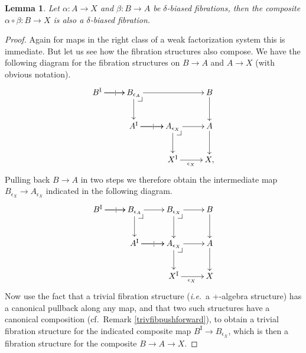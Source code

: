 \documentclass[11pt]{amsart}
\makeatletter
\newcommand{\ie}{\emph{i.e.}}
\newcommand{\ra}{\ensuremath{\rightarrow}}
\renewcommand{\to}{\ensuremath{\rightarrow}}
\newcommand{\I}{\ensuremath{\mathrm{I}}}
\newtheorem{lemma}[theorem]{Lemma}
\theoremstyle{remark}
\newtheorem{remark}[theorem]{Remark}
\theoremstyle{definition}
\newcommand{\pbcorner}[1][dr]{\save*!/#1-1.2pc/#1:(-1,1)@^{|-}\restore}
\makeatother
\begin{document}
\begin{lemma}\label{lemma:fibrationscompose}
Let  $\alpha : A \ra X$ and $\beta: B\ra A$ be $\delta$-biased fibrations, then the composite $\alpha\circ\beta : B \ra X$ is also a $\delta$-biased fibration.
\end{lemma}
\begin{proof}
Again for maps in the right class of a weak factorization system this is immediate.  But let us see how the fibration structures also compose.  We have the following diagram for the fibration structures on $B\ra A$ and $A\ra X$ (with obvious notation).
\begin{equation}\label{diagram:fibcomposition1}
\xymatrix{
B^\I \ar[r]|| \ar[r]  & B_{\epsilon_A} \ar[rr]  \ar[d] \pbcorner & & B \ar[d]\\
&A^\I \ar[r]|| \ar[r] & A_{\epsilon_X} \ar[d] \pbcorner \ar[r] & A \ar[d]\\
&& X^\I \ar[r]_{\epsilon_X} &  X,
}
\end{equation}
Pulling back $B\ra A$ in two steps we therefore obtain the intermediate map $B_{\epsilon_X} \to A_{\epsilon_X}$  indicated in the following diagram. 
\begin{equation}\label{diagram:fibcomposition2}
\xymatrix{
B^\I \ar[r]|| \ar[r]   & B_{\epsilon_A} \ar[r]  \ar[d] \pbcorner & B_{\epsilon_X}  \ar[d] \pbcorner \ar[r] & B \ar[d]\\
&A^\I \ar[r]|| \ar[r]  & A_{\epsilon_X} \ar[d] \pbcorner \ar[r] & A \ar[d]\\
&& X^\I \ar[r]_{\epsilon_X} &  X
}
\end{equation}
Now use the fact that a trivial fibration structure (\ie\ a +-algebra structure) has a canonical pullback along any map, and that two such structures have a canonical composition (cf.\ Remark \ref{trivfibpushforward}), to obtain a trivial fibration structure for the indicated composite map $B^\I \ra B_{\epsilon_X}$, which is then a fibration structure for the composite $B\to A\to X$.
\end{proof}

\end{document}
